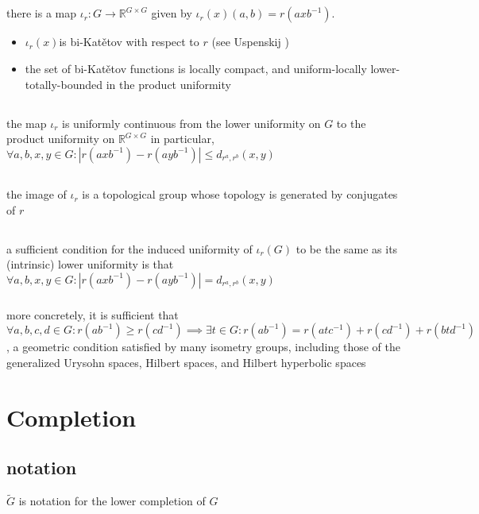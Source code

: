 \documentclass[a4paper]{article}
\newcommand{\R}{\mathbb{R}}
\newcommand{\complete}[1]{\widetilde{#1}}
\newcommand{\inv }{^{-1}}
\begin{document}
\subsection{} there is a map $\iota_r:G\to\R^{G\times G}$ given by $\iota_r(x)(a,b)=r(axb\inv )$.
\begin{itemize}
\item $\iota_r(x)$is bi-Katětov with respect to $r$ (see Uspenskij \cite{uspenskij2008subgroups})
\item the set of bi-Katětov functions is locally compact, and uniform-locally lower-totally-bounded in the product uniformity
\end{itemize}
\subsection{} the map $\iota_r$ is uniformly continuous from the lower uniformity on $G$ to the product uniformity on $\R^{G\times G}$
in particular, $\forall a,b,x,y\in G :|r(axb\inv )-r(ayb\inv )|\leq d_{r^a,r^b}(x,y)$
\subsection{} the image of $\iota_r$ is a topological group whose topology is generated by conjugates of $r$
\subsection{} a sufficient condition for the induced uniformity of $\iota_r(G)$ to be the same as its (intrinsic) lower uniformity is that $\forall a,b,x,y\in G: |r(axb\inv )-r(ayb\inv )|=d_{r^a,r^b}(x,y)$
\subsubsection*{} more concretely, it is sufficient that $\forall a,b,c,d\in G:r(ab\inv )\geq r(cd\inv ) \implies\exists t\in G: r(ab\inv ) = r(atc\inv )+r(cd\inv )+r(btd\inv )$, a geometric condition satisfied by many isometry groups, including those of the generalized Urysohn spaces, Hilbert spaces, and Hilbert hyperbolic spaces
\section{Completion}
\subsection{notation} $\complete{G}$ is notation for the lower completion of $G$ 
\end{document}
